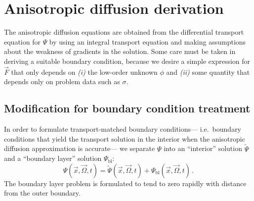 \section{Anisotropic diffusion derivation}\label{sec:adDerivation}
The anisotropic diffusion equations are obtained from the differential transport
equation for $\Psi$ by using an integral transport equation and making
assumptions about the weakness of gradients in the solution. Some care must be
taken in deriving
a suitable boundary condition, because we desire a simple expression for
$\vec{F}$ that only depends on \textsl{(i)} the low-order unknown $\phi$ and
\textsl{(ii)} some quantity that depends only
on problem data such as $\sigma$.

\subsection{Modification for boundary condition treatment}
In order to formulate transport-matched boundary conditions---%
i.e.~boundary conditions that yield the transport solution in the interior when
the anisotropic diffusion approximation is accurate---%
we separate $\Psi$ into an ``interior'' solution $\tilde\Psi$ and a ``boundary
layer'' solution $\Psi_\mathrm{bl}$:
\begin{equation} \label{eq:boundaryLayerPsi}
  \Psi(\vec{x}, \vec{\Omega}, t)
  = \tilde\Psi(\vec{x}, \vec{\Omega}, t)
  + \Psi_\mathrm{bl}(\vec{x}, \vec{\Omega}, t)\,.
\end{equation}
The boundary layer problem is formulated to tend to zero rapidly with distance
from the outer boundary.

